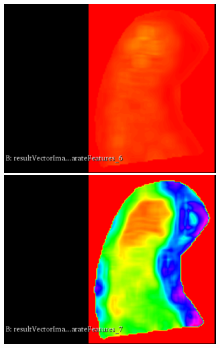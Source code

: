 \documentclass{InsightArticle}
\begin{document}
\begin{figure}[H]
  \begin{center}
    \includegraphics[scale=0.3]{figures/ShortRunLowGreyLevelEmphasis.eps}
    \includegraphics[scale=0.3]{figures/ShortRunHighGreyLevelEmphasis.eps}

\end{center}
\end{figure}
\end{document}
